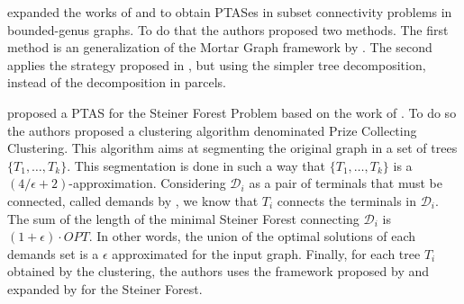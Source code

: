 \cite{Borradaile2012} expanded the works of \citeauthor{Borradaile2009b} and \citeauthor{KleinTSP} to obtain PTASes in subset connectivity problems in bounded-genus graphs. To do that the authors proposed two methods. The first method is an generalization of the Mortar Graph framework by \cite{KleinTSP}. The second applies the strategy proposed in \cite{Borradaile2009b}, but using the simpler tree decomposition, instead of the decomposition in parcels.


\cite{Bateni} proposed a PTAS for the Steiner Forest Problem based on the work of \cite{Borradaile2009b}. To do so the authors proposed a clustering algorithm denominated Prize Collecting Clustering. This algorithm aims at segmenting the original graph in a set of trees \(\{T_1, \dots, T_k\}\). This segmentation is done in such a way that \(\{T_1, \dots, T_k\}\) is a \((4/\epsilon + 2)\)-approximation. Considering \(\mathcal{D}_i\) as a pair of terminals that must be connected, called demands by \citeauthor{Bateni}, we know that \(T_i\) connects the terminals in \(\mathcal{D}_i\). The sum of the length of the minimal Steiner Forest connecting \(\mathcal{D}_i\) is \((1 + \epsilon) \cdot OPT\). In other words, the union of the optimal solutions of each demands set is a \(\epsilon\) approximated for the input graph. Finally, for each tree \(T_i\) obtained by the clustering, the authors uses the framework proposed by \cite{KleinTSP} and expanded by \cite{Borradaile2009b, Borradaile2012} for the Steiner Forest.


